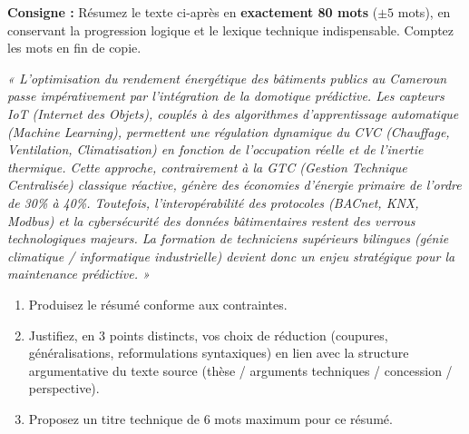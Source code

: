 \documentclass[11pt]{article}
\begin{document}
\begin{exercice}
\textbf{Consigne :} Résumez le texte ci-après en \textbf{exactement 80 mots} ($\pm 5$ mots), en conservant la progression logique et le lexique technique indispensable. Comptez les mots en fin de copie.

\textit{« L'optimisation du rendement énergétique des bâtiments publics au Cameroun passe impérativement par l'intégration de la domotique prédictive. Les capteurs IoT (Internet des Objets), couplés à des algorithmes d'apprentissage automatique (Machine Learning), permettent une régulation dynamique du CVC (Chauffage, Ventilation, Climatisation) en fonction de l'occupation réelle et de l'inertie thermique. Cette approche, contrairement à la GTC (Gestion Technique Centralisée) classique réactive, génère des économies d'énergie primaire de l'ordre de 30\% à 40\%. Toutefois, l'interopérabilité des protocoles (BACnet, KNX, Modbus) et la cybersécurité des données bâtimentaires restent des verrous technologiques majeurs. La formation de techniciens supérieurs \og bilingues \fg{} (génie climatique / informatique industrielle) devient donc un enjeu stratégique pour la maintenance prédictive. »}

\begin{enumerate}
    \item Produisez le résumé conforme aux contraintes.
    \item Justifiez, en 3 points distincts, vos choix de réduction (coupures, généralisations, reformulations syntaxiques) en lien avec la structure argumentative du texte source (thèse / arguments techniques / concession / perspective).
    \item Proposez un titre technique de 6 mots maximum pour ce résumé.
\end{enumerate}
\end{exercice}
\end{document}
